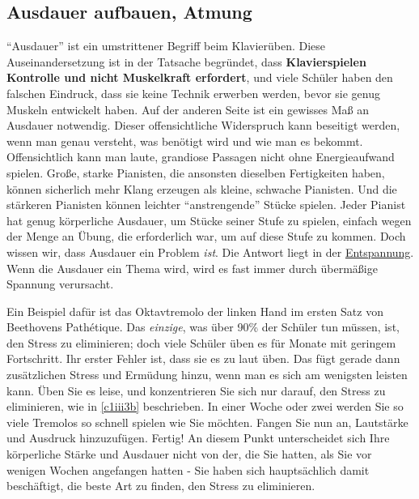 
\subsection{Ausdauer aufbauen, Atmung}
\label{c1ii21}

\enquote{Ausdauer} ist ein umstrittener Begriff beim Klavierüben.
Diese Auseinandersetzung ist in der Tatsache begründet, dass \textbf{Klavierspielen Kontrolle und nicht Muskelkraft erfordert}, und viele Schüler haben den falschen Eindruck, dass sie keine Technik erwerben werden, bevor sie genug Muskeln entwickelt haben.
Auf der anderen Seite ist ein gewisses Maß an Ausdauer notwendig.
Dieser offensichtliche Widerspruch kann beseitigt werden, wenn man genau versteht, was benötigt wird und wie man es bekommt.
Offensichtlich kann man laute, grandiose Passagen nicht ohne Energieaufwand spielen.
Große, starke Pianisten, die ansonsten dieselben Fertigkeiten haben, können sicherlich mehr Klang erzeugen als kleine, schwache Pianisten.
Und die stärkeren Pianisten können leichter \enquote{anstrengende} Stücke spielen.
Jeder Pianist hat genug körperliche Ausdauer, um Stücke seiner Stufe zu spielen, einfach wegen der Menge an Übung, die erforderlich war, um auf diese Stufe zu kommen.
Doch wissen wir, dass Ausdauer ein Problem \textit{ist}.
Die Antwort liegt in der \hyperref[c1ii14]{Entspannung}.
Wenn die Ausdauer ein Thema wird, wird es fast immer durch übermäßige Spannung verursacht.

Ein Beispiel dafür ist das Oktavtremolo der linken Hand im ersten Satz von Beethovens Pathétique.
Das \textit{einzige}, was über 90\% der Schüler tun müssen, ist, den Stress zu eliminieren; doch viele Schüler üben es für Monate mit geringem Fortschritt.
Ihr erster Fehler ist, dass sie es zu laut üben.
Das fügt gerade dann zusätzlichen Stress und Ermüdung hinzu, wenn man es sich am wenigsten leisten kann.
Üben Sie es leise, und konzentrieren Sie sich nur darauf, den Stress zu eliminieren, wie in \hyperref[c1iii3b]{\autoref{c1iii3b}} beschrieben.
In einer Woche oder zwei werden Sie so viele Tremolos so schnell spielen wie Sie möchten.
Fangen Sie nun an, Lautstärke und Ausdruck hinzuzufügen. Fertig!
An diesem Punkt unterscheidet sich Ihre körperliche Stärke und Ausdauer nicht von der, die Sie hatten, als Sie vor wenigen Wochen angefangen hatten - Sie haben sich hauptsächlich damit beschäftigt, die beste Art zu finden, den Stress zu eliminieren.

